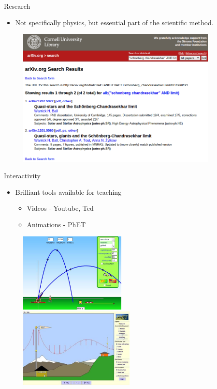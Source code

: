 \documentclass{beamer}
\begin{document}
\begin{frame}{Research}
    \begin{itemize}
        \item Not specifically physics, but essential part of the scientific method.
    \end{itemize}    
    \begin{figure}
        \includegraphics[width=0.9\textwidth]{arxiv_search.png}
    \end{figure}
\end{frame}

\begin{frame}{Interactivity}
    \begin{itemize}
        \item Brilliant tools available for teaching
        \begin{itemize}
            \item Videos - Youtube, Ted
            \item Animations - PhET
        \end{itemize}
    \end{itemize}
    \begin{figure}
        \includegraphics[height=4cm]{phet-1.jpg}
         ~
        \includegraphics[height=4cm]{phet-2.jpg}
    \end{figure}
\end{frame}
\end{document}
